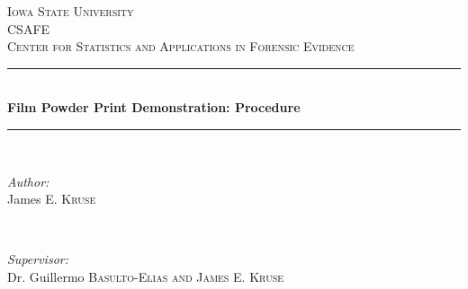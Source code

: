 \begin{titlepage}

\newcommand{\HRule}{\rule{\linewidth}{0.5mm}} %

\center %
 

\textsc{\LARGE Iowa State University}\\[1.5cm] %
\textsc{\Large CSAFE}\\[0.5cm] %
\textsc{\large Center for Statistics and Applications in Forensic Evidence }\\[0.5cm] %


\HRule \\[0.4cm]
{ \huge \bfseries Film Powder Print Demonstration: Procedure  }\\[0.4cm] %
\HRule \\[1.5cm]
 

\begin{minipage}{0.4\textwidth}
\begin{flushleft} \large
\emph{Author:}\\
James \textsc{E. Kruse} %
\end{flushleft}
\end{minipage}
~
\begin{minipage}{0.4\textwidth}
\begin{flushright} \large
\emph{Supervisor:} \\
Dr. Guillermo \textsc{Basulto-Elias and James E. Kruse} %
\end{flushright}
\end{minipage}\\[2cm]


\end{titlepage}
